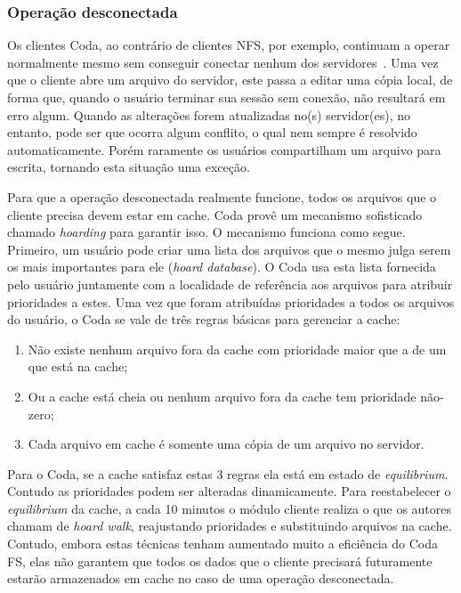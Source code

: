 \subsubsection*{Operação desconectada}

Os clientes Coda, ao contrário de clientes NFS, por exemplo, continuam a operar normalmente mesmo sem conseguir conectar nenhum dos servidores~\cite{kistler1992disconnected}. Uma vez que o cliente abre um arquivo do servidor, este  passa a editar uma cópia local, de forma que, quando o usuário terminar sua sessão sem conexão, não resultará em erro algum. Quando as alterações forem atualizadas no(s) servidor(es), no entanto, pode ser que ocorra algum conflito, o qual nem sempre é resolvido automaticamente. Porém raramente os usuários compartilham um arquivo para escrita, tornando esta situação uma exceção.

Para que a operação desconectada realmente funcione, todos os arquivos que o cliente precisa devem estar em cache. Coda provê um mecanismo sofisticado chamado \emph{hoarding} para garantir isso. O mecanismo funciona como segue. Primeiro, um usuário pode criar uma lista dos arquivos que o mesmo julga serem os mais importantes para ele (\emph{hoard database}). O Coda usa esta lista fornecida pelo usuário juntamente com a localidade de referência aos arquivos para atribuir prioridades a estes. Uma vez que foram atribuídas prioridades a todos os arquivos do usuário, o Coda se vale de três regras básicas para gerenciar a cache:

\begin{enumerate}
	\item Não existe nenhum arquivo fora da cache com prioridade maior que a de um que está na cache;
	\item Ou a cache está cheia ou nenhum arquivo fora da cache tem prioridade não-zero;
	\item Cada arquivo em cache é somente uma cópia de um arquivo no servidor.
\end{enumerate}

Para o Coda, se a cache satisfaz estas 3 regras ela está em estado de \emph{equilibrium}. Contudo as prioridades podem ser alteradas dinamicamente. Para reestabelecer o \emph{equilibrium} da cache, a cada 10 minutos o módulo cliente realiza o que os autores chamam de \emph{hoard walk}, reajustando prioridades e substituindo arquivos na cache. Contudo, embora estas técnicas tenham aumentado muito a eficiência do Coda FS, elas não garantem que todos os dados que o cliente precisará futuramente estarão armazenados em cache no caso de uma operação desconectada.

